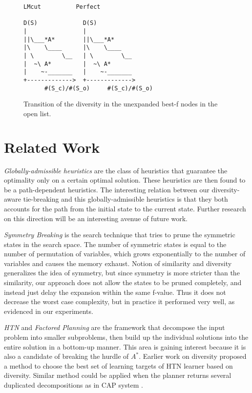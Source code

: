 \begin{figure}[htbp]
\begin{verbatim}
LMcut          Perfect       

D(S)             D(S)                             
|                |             
||\___*A*        ||\___*A*      
|\    \____      |\    \____   
| \        \__   | \        \__
|  ~\ A*         |  ~\ A*      
|    ~-_______   |    ~-_______
+------------->  +------------->
      #(S_c)/#(S_o)     #(S_c)/#(S_o)
\end{verbatim}
\caption{Transition of the diversity in the unexpanded best-f nodes in the open list.}
\label{diversity-transition}
\end{figure}

\section{Related Work}
\label{sec-4}
\emph{Globally-admissible heuristics} \cite{karpas2012optimal} are the class of heuristics that guarantee the optimality only on a certain optimal solution. These heuristics are then found to be a path-dependent heuristics. The interesting relation between our diversity-aware tie-breaking and this globally-admissible heuristics is that they both accounts for the path from the initial state to the current state. Further research on this direction will be an interesting avenue of  future work.

\emph{Symmetry Breaking} \cite{Fox1998,pochter2011exploiting,domshlak2013symmetry} is the search technique that tries to prune the symmetric states in the search space. The number of symmetric states is equal to the number of permutation of variables, which grows exponentially to the number of variables and causes the memory exhaust. Notion of similarity and diversity generalizes the idea of symmetry, but since symmetry is more stricter than the similarity, our approach does not allow the states to be pruned completely, and instead just delay the expansion within the same f-value. Thus it does not decrease the worst case complexity, but in practice it performed very well, as evidenced in our experiments.

\emph{HTN} \cite{erol1994} and \emph{Factored Planning} \cite{amir2003factored,brafman2006factored,Asai2015} are the framework that decompose the input problem into smaller subproblems, then build up the individual solutions into the entire solution in a bottom-up manner. This area is gaining interest because it is also a candidate of breaking the hurdle of $A^*$. Earlier work on diversity \cite{goldman2015measuring} proposed a method to choose the best set of learning targets of HTN learner based on diversity. Similar method could be applied when the planner returns several duplicated decompositions as in CAP system \cite{Asai2015}.


